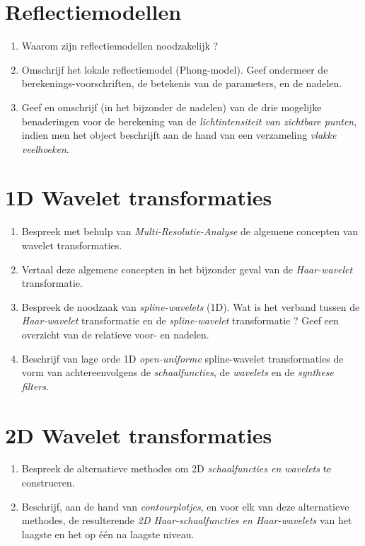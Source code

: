 \documentclass{report}
\begin{document}
	\section{Reflectiemodellen }
	\begin{enumerate}
		\item Waarom zijn reflectiemodellen noodzakelijk ?
		
		\item Omschrijf het lokale reflectiemodel (Phong-model). Geef ondermeer de
		 berekenings-voorschriften, de betekenis van de parameters, en de nadelen.
		 
		\item Geef en omschrijf (in het bijzonder de nadelen) van de drie mogelijke benaderingen voor de berekening van de \textit{lichtintensiteit van zichtbare punten}, indien men het object beschrijft aan de hand van een verzameling \textit{vlakke veelhoeken}.
		
	\end{enumerate}

	\section{1D Wavelet transformaties}
	\begin{enumerate}
		\item Bespreek met behulp van \textit{Multi-Resolutie-Analyse} de algemene concepten van wavelet transformaties. 
		
		\item Vertaal deze algemene concepten in het bijzonder geval van de \textit{Haar-wavelet} transformatie. 

		
		\item Bespreek de noodzaak van \textit{spline-wavelets} (1D). Wat is het verband tussen de \textit{Haar-wavelet} transformatie en de \textit{spline-wavelet} transformatie ? Geef een overzicht van de relatieve voor- en nadelen. 
		
		\item Beschrijf van lage orde 1D \textit{open-uniforme} spline-wavelet transformaties de vorm van achtereenvolgens de \textit{schaalfuncties}, de \textit{wavelets} en de \textit{synthese filters}.
	\end{enumerate}

	\section{2D Wavelet transformaties }
	\begin{enumerate}
		\item Bespreek de alternatieve methodes om 2D \textit{schaalfuncties en wavelets} te construeren.
		
		\item Beschrijf, aan de hand van \textit{contourplotjes}, en voor elk van deze alternatieve methodes, de resulterende \textit{2D Haar-schaalfuncties en Haar-wavelets} van het laagste en het op één na laagste niveau.
	\end{enumerate}
\end{document}
